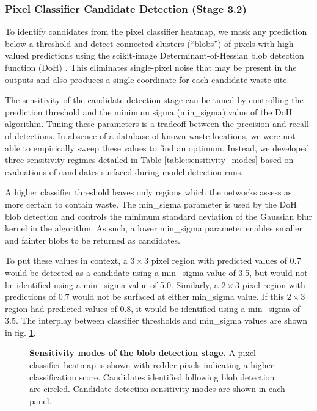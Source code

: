 \documentclass[10pt,letterpaper]{article}
\begin{document}
\subsubsection*{Pixel Classifier Candidate Detection (Stage 3.2)}
To identify candidates from the pixel classifier heatmap, we mask any prediction below a threshold and detect connected clusters (“blobs”) of pixels with high-valued predictions using the scikit-image Determinant-of-Hessian blob detection function (DoH) \cite{van2014scikit}. This eliminates single-pixel noise that may be present in the outputs and also produces a single coordinate for each candidate waste site. 

The sensitivity of the candidate detection stage can be tuned by controlling the prediction threshold and the minimum sigma (min\_sigma) value of the DoH algorithm. Tuning these parameters is a tradeoff between the precision and recall of detections. In absence of a database of known waste locations, we were not able to empirically sweep these values to find an optimum. Instead, we developed three sensitivity regimes detailed in Table \ref{table:sensitivity_modes} based on evaluations of candidates surfaced during model detection runs.
 
A higher classifier threshold leaves only regions which the networks assess as more certain to contain waste. The min\_sigma parameter is used by the DoH blob detection and controls the minimum standard deviation of the Gaussian blur kernel in the algorithm. As such, a lower min\_sigma parameter enables smaller and fainter blobs to be returned as candidates.
 
To put these values in context, a $3\times3$ pixel region with predicted values of 0.7 would be detected as a candidate using a min\_sigma value of 3.5, but would not be identified using a min\_sigma value of 5.0. Similarly, a $2\times3$ pixel region with predictions of 0.7 would not be surfaced at either min\_sigma value.  If this $2\times3$ region had predicted values of 0.8, it would be identified using a min\_sigma of 3.5. The interplay between classifier thresholds and min\_sigma values are shown in fig. \ref{fig:blob_detection}.


\begin{figure}[!h]
    \caption{{\bf Sensitivity modes of the blob detection stage.}
    A pixel classifier heatmap is shown with redder pixels indicating a higher classification score. Candidates identified following blob detection are circled. Candidate detection sensitivity modes are shown in each panel.}
    \label{fig:blob_detection}
\end{figure}
\end{document}
